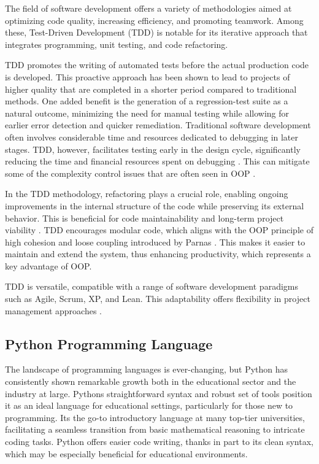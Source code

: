 The field of software development offers a variety of methodologies
aimed at optimizing code quality, increasing efficiency, and promoting
teamwork. Among these, Test-Driven Development (TDD) is notable for its
iterative approach that integrates programming, unit testing, and code
refactoring.

TDD promotes the writing of automated tests before the actual production
code is developed. This proactive approach has been shown to lead to
projects of higher quality that are completed in a shorter period
compared to traditional methods. One added benefit is the generation of
a regression-test suite as a natural outcome, minimizing the need for
manual testing while allowing for earlier error detection and quicker
remediation. Traditional software development often involves
considerable time and resources dedicated to debugging in later stages.
TDD, however, facilitates testing early in the design cycle,
significantly reducing the time and financial resources spent on
debugging \cite{29}. This can
mitigate some of the complexity control issues that are often seen in
OOP \cite{23}\cite{25}.

In the TDD methodology, refactoring plays a crucial role, enabling
ongoing improvements in the internal structure of the code while
preserving its external behavior. This is beneficial for code
maintainability and long-term project viability
\cite{30}. TDD encourages
modular code, which aligns with the OOP principle of high cohesion and
loose coupling introduced by Parnas
\cite{17}\cite{24}. This
makes it easier to maintain and extend the system, thus enhancing
productivity, which represents a key advantage of OOP.

TDD is versatile, compatible with a range of software development
paradigms such as Agile, Scrum, XP, and Lean. This adaptability offers
flexibility in project management approaches
\cite{31}.

\subsection{Python Programming
Language}\label{python-programming-language}

The landscape of programming languages is ever-changing, but Python has
consistently shown remarkable growth both in the educational sector and
the industry at large. Python\textquotesingle s straightforward syntax
and robust set of tools position it as an ideal language for educational
settings, particularly for those new to programming.
It\textquotesingle s the go-to introductory language at many top-tier
universities, facilitating a seamless transition from basic mathematical
reasoning to intricate coding tasks. Python offers easier code writing, thanks in part to its
clean syntax, which may be especially beneficial for educational
environments.

